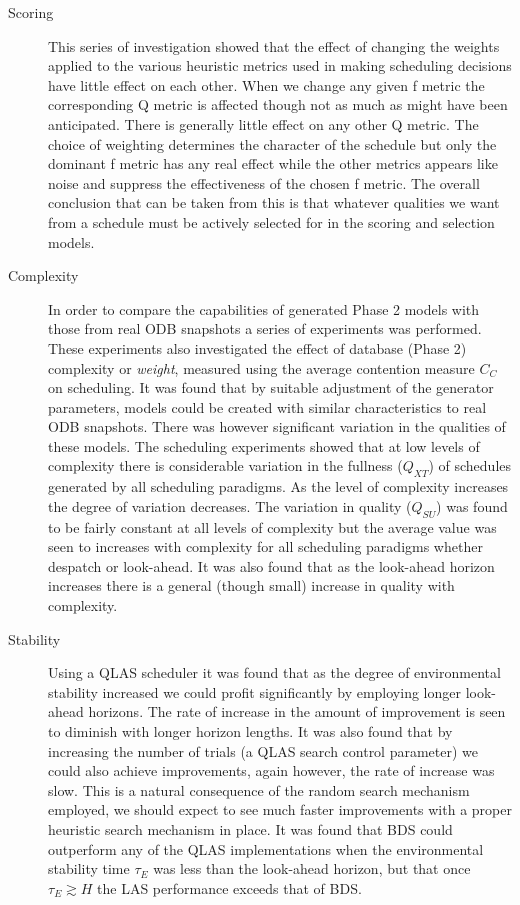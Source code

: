 \begin{description}
 \item[Scoring]
 This series of investigation showed that the effect of changing the weights applied to the various heuristic metrics used in making scheduling decisions have little effect on each other. When we change any given f metric the corresponding Q metric is affected though not as much as might have been anticipated. There is generally little effect on any other Q metric. The choice of weighting determines the character of the schedule but only the dominant f metric has any real effect while the other metrics appears like noise and suppress the effectiveness of the chosen f metric. The overall conclusion that can be taken from this is that whatever qualities we want from a schedule must be actively selected for in the scoring and selection models. 
 \item[Complexity]
 In order to compare the capabilities of generated Phase 2 models with those from real ODB snapshots a series of experiments was performed. These experiments also investigated the effect of database (Phase 2) complexity or \emph{weight}, measured using the average contention measure $C_C$ on scheduling. It was found that by suitable adjustment of the generator parameters, models could be created with similar characteristics to real ODB snapshots. There was however significant variation in the qualities of these models. The scheduling experiments showed that at low levels of complexity there is considerable variation in the fullness ($Q_{XT}$) of schedules generated by all scheduling paradigms. As the level of complexity increases the degree of variation decreases. The variation in quality ($Q_{SU}$) was found to be fairly constant at all levels of complexity but the average value was seen to increases with complexity for all scheduling paradigms whether despatch or look-ahead. It was also found that as the look-ahead horizon increases there is a general (though small) increase in quality with complexity. 

 \item[Stability]
Using a QLAS scheduler it was found that as the degree of environmental stability increased we could profit significantly by employing longer look-ahead horizons. The rate of increase in the amount of improvement is seen to diminish with longer horizon lengths. It was also found that by increasing the number of trials (a QLAS search control parameter) we could also achieve improvements, again however, the rate of increase was slow. This is a natural consequence of the random search mechanism employed, we should expect to see much faster improvements with a proper heuristic search mechanism in place. It was found that BDS could outperform any of the QLAS implementations when the environmental stability time $\tau_E$ was less than the look-ahead horizon, but that once $\tau_E \apprge H$ the LAS performance exceeds that of BDS. 


\end{description}
